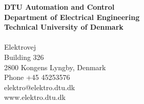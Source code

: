 \thispagestyle{empty} %
\frieze
\vspace*{\fill}
\noindent
\sffamily
\scriptsize
\textbf{DTU Automation and Control}\\
\textbf{Department of Electrical Engineering}\\
\textbf{Technical University of Denmark}\\
\\
Elektrovej\\
Building 326\\
2800 Kongens Lyngby, Denmark\\
Phone +45 45253576\\
elektro@elektro.dtu.dk\\
www.elektro.dtu.dk\\
\normalsize
\normalfont
\vspace*{2.5cm}
